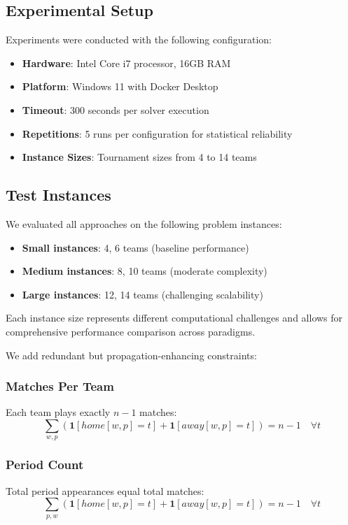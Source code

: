 \documentclass[11pt]{article}
\begin{document}
\subsection{Experimental Setup}

Experiments were conducted with the following configuration:
\begin{itemize}
    \item \textbf{Hardware}: Intel Core i7 processor, 16GB RAM
    \item \textbf{Platform}: Windows 11 with Docker Desktop
    \item \textbf{Timeout}: 300 seconds per solver execution
    \item \textbf{Repetitions}: 5 runs per configuration for statistical reliability
    \item \textbf{Instance Sizes}: Tournament sizes from 4 to 14 teams
\end{itemize}

\subsection{Test Instances}

We evaluated all approaches on the following problem instances:
\begin{itemize}
    \item \textbf{Small instances}: 4, 6 teams (baseline performance)
    \item \textbf{Medium instances}: 8, 10 teams (moderate complexity)
    \item \textbf{Large instances}: 12, 14 teams (challenging scalability)
\end{itemize}

Each instance size represents different computational challenges and allows for comprehensive performance comparison across paradigms.

We add redundant but propagation-enhancing constraints:

\subsubsection{Matches Per Team}
Each team plays exactly $n-1$ matches:
\begin{equation}
\sum_{w,p} (\mathbf{1}[home[w,p] = t] + \mathbf{1}[away[w,p] = t]) = n-1 \quad \forall t
\end{equation}

\subsubsection{Period Count}
Total period appearances equal total matches:
\begin{equation}
\sum_{p,w} (\mathbf{1}[home[w,p] = t] + \mathbf{1}[away[w,p] = t]) = n-1 \quad \forall t
\end{equation}
\end{document}
